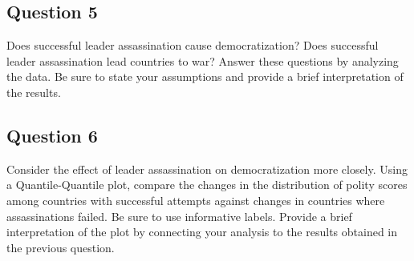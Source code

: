 \documentclass[]{article}
\begin{document}
\subsection{Question 5}\label{question-5}

Does successful leader assassination cause democratization? Does
successful leader assassination lead countries to war? Answer these
questions by analyzing the data. Be sure to state your assumptions and
provide a brief interpretation of the results.

\subsection{Question 6}\label{question-6}

Consider the effect of leader assassination on democratization more
closely. Using a Quantile-Quantile plot, compare the changes in the
distribution of polity scores among countries with successful attempts
against changes in countries where assassinations failed. Be sure to use
informative labels. Provide a brief interpretation of the plot by
connecting your analysis to the results obtained in the previous
question.
\end{document}
